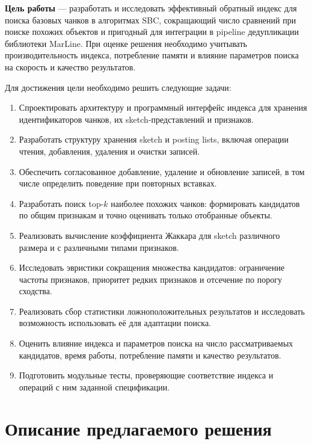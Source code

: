 \documentclass[a4paper]{article}
\begin{document}
\textbf{Цель работы} --- разработать и исследовать эффективный обратный индекс для поиска базовых чанков в алгоритмах SBC, сокращающий число сравнений при поиске похожих объектов и пригодный для интеграции в pipeline дедупликации библиотеки MarLine. При оценке решения необходимо учитывать производительность индекса, потребление памяти и влияние параметров поиска на скорость и качество результатов.

Для достижения цели необходимо решить следующие задачи:
\begin{enumerate}
    \item Спроектировать архитектуру и программный интерфейс индекса для хранения идентификаторов чанков, их sketch-представлений и признаков.
    \item Разработать структуру хранения sketch и posting lists, включая операции чтения, добавления, удаления и очистки записей.
    \item Обеспечить согласованное добавление, удаление и обновление записей, в том числе определить поведение при повторных вставках.
    \item Разработать поиск top-$k$ наиболее похожих чанков: формировать кандидатов по общим признакам и точно оценивать только отобранные объекты.
    \item Реализовать вычисление коэффициента Жаккара для sketch различного размера и с различными типами признаков.
    \item Исследовать эвристики сокращения множества кандидатов: ограничение частоты признаков, приоритет редких признаков и отсечение по порогу сходства.
    \item Реализовать сбор статистики ложноположительных результатов и исследовать возможность использовать её для адаптации поиска.
    \item Оценить влияние индекса и параметров поиска на число рассматриваемых кандидатов, время работы, потребление памяти и качество результатов.
    \item Подготовить модульные тесты, проверяющие соответствие индекса и операций с ним заданной спецификации.
\end{enumerate}

\section{Описание предлагаемого решения}

\end{document}
